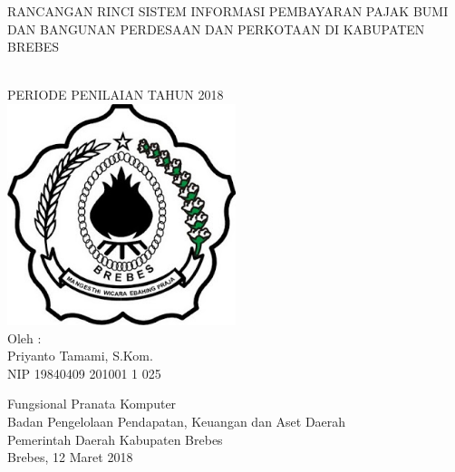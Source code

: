 \begin{titlepage}

\begin{center}
{\large RANCANGAN RINCI SISTEM INFORMASI PEMBAYARAN PAJAK BUMI DAN BANGUNAN PERDESAAN DAN PERKOTAAN DI KABUPATEN BREBES}

\HRule\\[1cm]

PERIODE PENILAIAN TAHUN 2018\\[1cm]

\includegraphics[width=0.5\textwidth]{./resources/logo}\\[1cm]

Oleh :\\
Priyanto Tamami, S.Kom.\\
NIP 19840409 201001 1 025\\


\vfill


Fungsional Pranata Komputer\\
Badan Pengelolaan Pendapatan, Keuangan dan Aset Daerah\\
Pemerintah Daerah Kabupaten Brebes\\
Brebes, 12 Maret 2018
\end{center}

\end{titlepage}